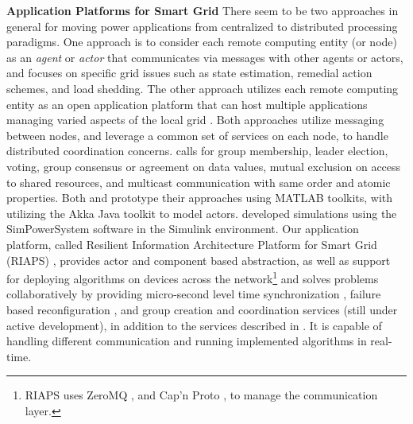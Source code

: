 \documentclass[sigplan]{acmart}
\begin{document}
\textbf{Application Platforms for Smart Grid} There seem to be two approaches in general for moving power applications
from centralized to distributed processing paradigms.
One approach is to consider each remote computing entity (or node) as an \textit{agent} \cite{underfreq-2015} or \textit{actor} \cite{agha1985actors} \cite{LeeNiddodiSrivastavaBakken2016} that communicates via messages with other agents or actors, and focuses on specific grid issues such as state estimation, remedial action schemes, and load shedding. The other approach utilizes each remote computing entity as an open application platform that can host multiple applications managing varied aspects of the local grid  \cite{freedmSysArch2014}. Both approaches utilize messaging between nodes, and leverage a common set of services on each node, to handle distributed coordination concerns. \cite{LeeNiddodiSrivastavaBakken2016} calls for group membership, leader election, voting, group consensus or agreement on data values, mutual exclusion on access to shared resources, and multicast communication with same order and atomic properties. Both \cite{underfreq-2015} and \cite{LeeNiddodiSrivastavaBakken2016} prototype their approaches using MATLAB toolkits, with \cite{LeeNiddodiSrivastavaBakken2016} utilizing the Akka Java toolkit to model actors. \cite{Meng2010} developed simulations using the SimPowerSystem software in the Simulink environment. Our application platform, called Resilient Information Architecture Platform for Smart Grid (RIAPS)
\cite{riaps1}, provides actor and component based abstraction, as well as support for deploying algorithms on devices across the network\footnote{RIAPS uses ZeroMQ \cite{hintjens2010zeromq}, and Cap'n Proto \cite{varda2015cap}, to manage the communication layer.} and solves problems collaboratively by providing micro-second level time synchronization \cite{riaps2}, failure based reconfiguration \cite{dubey2017resilience}, and group creation and coordination services (still under active development), in addition to the services described in \cite{LeeNiddodiSrivastavaBakken2016}. It is capable of handling different communication and running implemented algorithms in real-time.
\end{document}
